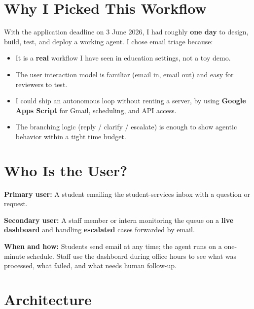 \documentclass[11pt,a4paper]{article}
\begin{document}
\section{Why I Picked This Workflow}

With the application deadline on 3 June 2026, I had roughly \textbf{one day} to design, build, test, and deploy a working agent. I chose email triage because:

\begin{itemize}[nosep]
  \item It is a \textbf{real} workflow I have seen in education settings, not a toy demo.
  \item The user interaction model is familiar (email in, email out) and easy for reviewers to test.
  \item I could ship an autonomous loop without renting a server, by using \textbf{Google Apps Script} for Gmail, scheduling, and API access.
  \item The branching logic (reply / clarify / escalate) is enough to show agentic behavior within a tight time budget.
\end{itemize}

\section{Who Is the User?}

\textbf{Primary user:} A student emailing the student-services inbox with a question or request.

\textbf{Secondary user:} A staff member or intern monitoring the queue on a \textbf{live dashboard} and handling \textbf{escalated} cases forwarded by email.

\textbf{When and how:} Students send email at any time; the agent runs on a one-minute schedule. Staff use the dashboard during office hours to see what was processed, what failed, and what needs human follow-up.

\section{Architecture}
\end{document}
